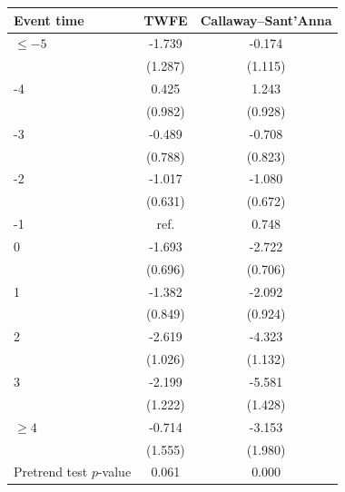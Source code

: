 \begin{tabular}{lcc}
\toprule
Event time & TWFE & Callaway--Sant'Anna \\
\midrule
\(\le -5\) & -1.739 & -0.174 \\
 & (1.287) & (1.115) \\
-4 &  0.425 &  1.243 \\
 & (0.982) & (0.928) \\
-3 & -0.489 & -0.708 \\
 & (0.788) & (0.823) \\
-2 & -1.017 & -1.080 \\
 & (0.631) & (0.672) \\
-1 & \multicolumn{1}{c}{ref.} &  0.748 \\
0 & -1.693 & -2.722 \\
 & (0.696) & (0.706) \\
1 & -1.382 & -2.092 \\
 & (0.849) & (0.924) \\
2 & -2.619 & -4.323 \\
 & (1.026) & (1.132) \\
3 & -2.199 & -5.581 \\
 & (1.222) & (1.428) \\
\(\ge 4\) & -0.714 & -3.153 \\
 & (1.555) & (1.980) \\
\midrule
Pretrend test \(p\)-value & 0.061 & 0.000 \\
\bottomrule
\end{tabular}
